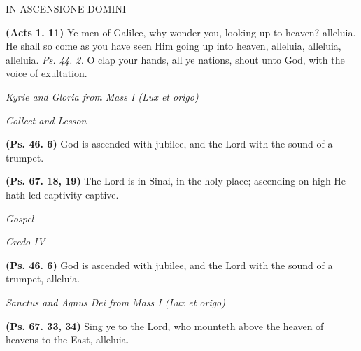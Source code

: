 \documentclass[11pt]{article} %
\begin{document}
\begin{center}\begin{huge}\textsc{IN ASCENSIONE DOMINI}\end{huge}\end{center}


\def\greinitialformat#1{%
{\fontsize{34}{34}\selectfont #1}%
}

\textbf{(Acts 1. 11)} Ye men of Galilee, why wonder you, looking up to heaven? alleluia.  He shall so come as you have seen Him going up into heaven, alleluia, alleluia, alleluia. \emph{Ps. 44. 2.} O clap your hands, all ye nations, shout unto God, with the voice of exultation.

\vskip10pt

\emph{Kyrie and Gloria from Mass I (Lux et origo)}

\emph{Collect and Lesson}

\vskip10pt

\textbf{(Ps. 46. 6)} God is ascended with jubilee, and the Lord with the sound of a trumpet.

\vskip10pt

\textbf{(Ps. 67. 18, 19)} The Lord is in Sinai, in the holy place; ascending on high He hath led captivity captive.

\vskip10pt

\emph{Gospel}

\emph{Credo IV}

\vskip20pt


\textbf{(Ps. 46. 6)} God is ascended with jubilee, and the Lord with the sound of a trumpet, alleluia.

\vskip10pt

\emph{Sanctus and Agnus Dei from Mass I (Lux et origo)}

\vskip20pt


\textbf{(Ps. 67. 33, 34)} Sing ye to the Lord, who mounteth above the heaven of heavens to the East, alleluia.
\end{document}
